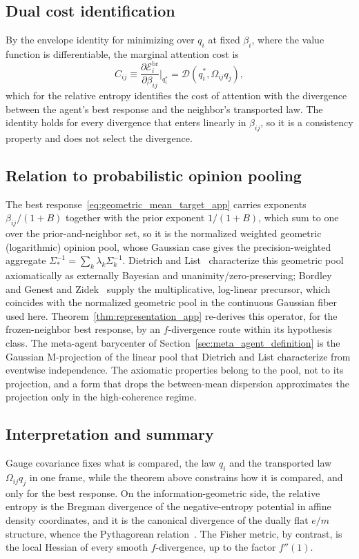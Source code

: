 \subsection*{Dual cost identification}
By the envelope identity for minimizing over $q_i$ at fixed $\beta_i$, where the value function is differentiable, the marginal attention cost is
\begin{equation}
C_{ij} \equiv \frac{\partial \mathcal E_i^{\mathrm{br}}}{\partial\beta_{ij}}\bigg|_{q_i^*}
= \mathcal{D}(q_i^*,\Omega_{ij}q_j),
\end{equation}
which for the relative entropy identifies the cost of attention with the divergence between the agent's best response and the neighbor's transported law. The identity holds for every divergence that enters linearly in $\beta_{ij}$, so it is a consistency property and does not select the divergence.

\subsection*{Relation to probabilistic opinion pooling}
The best response~\eqref{eq:geometric_mean_target_app} carries exponents $\beta_{ij}/(1+B)$ together with the prior exponent $1/(1+B)$, which sum to one over the prior-and-neighbor set, so it is the normalized weighted geometric (logarithmic) opinion pool, whose Gaussian case gives the precision-weighted aggregate $\Sigma_*^{-1} = \sum_k \lambda_k \Sigma_k^{-1}$. Dietrich and List~\cite{dietrich2016probabilistic} characterize this geometric pool axiomatically as externally Bayesian and unanimity/zero-preserving; Bordley~\cite{bordley1982multiplicative} and Genest and Zidek~\cite{GenestZidek1986} supply the multiplicative, log-linear precursor, which coincides with the normalized geometric pool in the continuous Gaussian fiber used here. Theorem~\ref{thm:representation_app} re-derives this operator, for the frozen-neighbor best response, by an $f$-divergence route within its hypothesis class. The meta-agent barycenter of Section~\ref{sec:meta_agent_definition} is the Gaussian M-projection of the linear pool that Dietrich and List characterize from eventwise independence. The axiomatic properties belong to the pool, not to its projection, and a form that drops the between-mean dispersion approximates the projection only in the high-coherence regime.

\subsection*{Interpretation and summary}
Gauge covariance fixes what is compared, the law $q_i$ and the transported law $\Omega_{ij}q_j$ in one frame, while the theorem above constrains how it is compared, and only for the best response. On the information-geometric side, the relative entropy is the Bregman divergence of the negative-entropy potential in affine density coordinates, and it is the canonical divergence of the dually flat $e/m$ structure, whence the Pythagorean relation~\cite{AmariNagaoka2000}. The Fisher metric, by contrast, is the local Hessian of every smooth $f$-divergence, up to the factor $f''(1)$.

